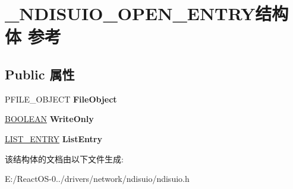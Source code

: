 \hypertarget{struct___n_d_i_s_u_i_o___o_p_e_n___e_n_t_r_y}{}\section{\+\_\+\+N\+D\+I\+S\+U\+I\+O\+\_\+\+O\+P\+E\+N\+\_\+\+E\+N\+T\+R\+Y结构体 参考}
\label{struct___n_d_i_s_u_i_o___o_p_e_n___e_n_t_r_y}
\subsection*{Public 属性}
\begin{DoxyCompactItemize}
\item 
\mbox{\label{struct___n_d_i_s_u_i_o___o_p_e_n___e_n_t_r_y_a78b0f11026470206dadb2844eaa5eb3d}} 
P\+F\+I\+L\+E\+\_\+\+O\+B\+J\+E\+CT {\bfseries File\+Object}
\item 
\mbox{\label{struct___n_d_i_s_u_i_o___o_p_e_n___e_n_t_r_y_a4c9e258408a3804d5844f0dcf73c630b}} 
\hyperlink{_processor_bind_8h_a112e3146cb38b6ee95e64d85842e380a}{B\+O\+O\+L\+E\+AN} {\bfseries Write\+Only}
\item 
\mbox{\label{struct___n_d_i_s_u_i_o___o_p_e_n___e_n_t_r_y_a6806c6a3e1289eb9427ab7aca6792342}} 
\hyperlink{struct___l_i_s_t___e_n_t_r_y}{L\+I\+S\+T\+\_\+\+E\+N\+T\+RY} {\bfseries List\+Entry}
\end{DoxyCompactItemize}


该结构体的文档由以下文件生成\+:\begin{DoxyCompactItemize}
\item 
E\+:/\+React\+O\+S-\/0../drivers/network/ndisuio/ndisuio.\+h\end{DoxyCompactItemize}
